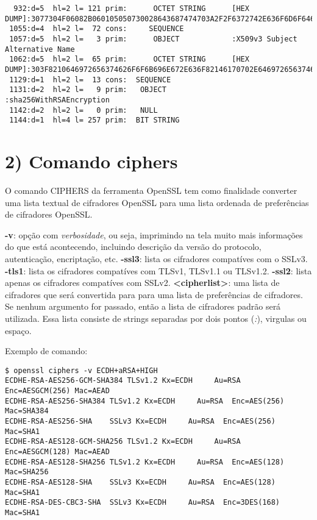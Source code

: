 \documentclass[a4paper,11pt]{article}
\theoremstyle{mytheor}
\begin{document}
\begin{lstlisting}
  932:d=5  hl=2 l= 121 prim:      OCTET STRING      [HEX DUMP]:3077304F06082B060105050730028643687474703A2F2F6372742E636F6D6F646F63612E636F6D2F434F4D4F444F525341446F6D61696E56616C69646174696F6E53656375726553657276657243412E637274302406082B060105050730018618687474703A2F2F6F6373702E636F6D6F646F63612E636F6D
 1055:d=4  hl=2 l=  72 cons:     SEQUENCE          
 1057:d=5  hl=2 l=   3 prim:      OBJECT            :X509v3 Subject Alternative Name
 1062:d=5  hl=2 l=  65 prim:      OCTET STRING      [HEX DUMP]:303F8210646972656374626F6F6B696E672E636F82146170702E646972656374626F6F6B696E672E636F8215617070322E646972656374626F6F6B696E672E636F
 1129:d=1  hl=2 l=  13 cons:  SEQUENCE          
 1131:d=2  hl=2 l=   9 prim:   OBJECT            :sha256WithRSAEncryption
 1142:d=2  hl=2 l=   0 prim:   NULL              
 1144:d=1  hl=4 l= 257 prim:  BIT STRING      
\end{lstlisting}

\section*{2) Comando ciphers}

O comando CIPHERS da ferramenta OpenSSL tem como finalidade converter uma lista textual de cifradores OpenSSL para uma lista ordenada de preferências de cifradores OpenSSL.

\noindent \textbf{-v}: opção com \textit{verbosidade}, ou seja, imprimindo na tela muito mais informações do que está acontecendo, incluindo descrição da versão do protocolo, autenticação, encriptação, etc. 
\newline\newline
\noindent \textbf{-ssl3}: lista os cifradores compatíves com o SSLv3.
\newline\newline
\noindent \textbf{-tls1}: lista os cifradores compatíves com TLSv1, TLSv1.1 ou TLSv1.2.
\newline\newline
\noindent \textbf{-ssl2}: lista apenas os cifradores compatíves com SSLv2.
\newline\newline
\noindent \textbf{<cipherlist>}: uma lista de cifradores que será convertida para para uma lista de preferências de cifradores. Se nenhum argumento for passado, então a lista de cifradores padrão será utilizada. Essa lista consiste de strings separadas por dois pontos (\textit{:}), virgulas ou espaço.

\noindent Exemplo de comando:
\begin{lstlisting}
$ openssl ciphers -v ECDH+aRSA+HIGH
ECDHE-RSA-AES256-GCM-SHA384 TLSv1.2 Kx=ECDH     Au=RSA  Enc=AESGCM(256) Mac=AEAD
ECDHE-RSA-AES256-SHA384 TLSv1.2 Kx=ECDH     Au=RSA  Enc=AES(256)  Mac=SHA384
ECDHE-RSA-AES256-SHA    SSLv3 Kx=ECDH     Au=RSA  Enc=AES(256)  Mac=SHA1
ECDHE-RSA-AES128-GCM-SHA256 TLSv1.2 Kx=ECDH     Au=RSA  Enc=AESGCM(128) Mac=AEAD
ECDHE-RSA-AES128-SHA256 TLSv1.2 Kx=ECDH     Au=RSA  Enc=AES(128)  Mac=SHA256
ECDHE-RSA-AES128-SHA    SSLv3 Kx=ECDH     Au=RSA  Enc=AES(128)  Mac=SHA1
ECDHE-RSA-DES-CBC3-SHA  SSLv3 Kx=ECDH     Au=RSA  Enc=3DES(168) Mac=SHA1
\end{lstlisting}
\end{document}
